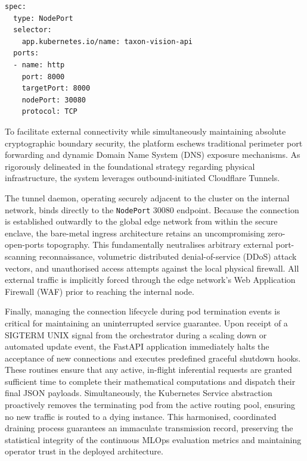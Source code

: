 \begin{listing}[htbp]
\begin{verbatim}
spec:
  type: NodePort
  selector:
    app.kubernetes.io/name: taxon-vision-api
  ports:
  - name: http
    port: 8000
    targetPort: 8000
    nodePort: 30080
    protocol: TCP
\end{verbatim}
\caption{Service exposure configuration routing traffic via a deterministic NodePort mapping.}
\label{lst:service_exposure}
\end{listing}

To facilitate external connectivity while simultaneously maintaining absolute cryptographic boundary security, the platform eschews traditional perimeter port forwarding and dynamic Domain Name System (DNS) exposure mechanisms. As rigorously delineated in the foundational strategy regarding physical infrastructure, the system leverages outbound-initiated Cloudflare Tunnels.

The tunnel daemon, operating securely adjacent to the cluster on the internal network, binds directly to the \texttt{NodePort} 30080 endpoint. Because the connection is established outwardly to the global edge network from within the secure enclave, the bare-metal ingress architecture retains an uncompromising zero-open-ports topography. This fundamentally neutralises arbitrary external port-scanning reconnaissance, volumetric distributed denial-of-service (DDoS) attack vectors, and unauthorised access attempts against the local physical firewall. All external traffic is implicitly forced through the edge network's Web Application Firewall (WAF) prior to reaching the internal node.

Finally, managing the connection lifecycle during pod termination events is critical for maintaining an uninterrupted service guarantee. Upon receipt of a SIGTERM UNIX signal from the orchestrator during a scaling down or automated update event, the FastAPI application immediately halts the acceptance of new connections and executes predefined graceful shutdown hooks. These routines ensure that any active, in-flight inferential requests are granted sufficient time to complete their mathematical computations and dispatch their final JSON payloads. Simultaneously, the Kubernetes Service abstraction proactively removes the terminating pod from the active routing pool, ensuring no new traffic is routed to a dying instance. This harmonised, coordinated draining process guarantees an immaculate transmission record, preserving the statistical integrity of the continuous MLOps evaluation metrics and maintaining operator trust in the deployed architecture.
